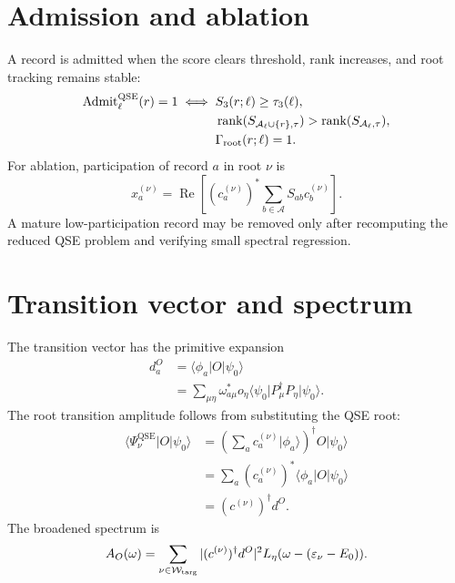 \documentclass[10pt,twocolumn]{article}
\newcommand{\Acal}{\mathcal A}
\newcommand{\Wcal}{\mathcal W}
\newcommand{\qse}{\mathrm{QSE}}
\newcommand{\rank}{\operatorname{rank}}
\newcommand{\ket}[1]{\lvert #1\rangle}
\newcommand{\bra}[1]{\langle #1\rvert}
\begin{document}
\section{Admission and ablation}

A record is admitted when the score clears threshold, rank increases, and root tracking remains stable:
\begin{equation}
\begin{aligned}
\operatorname{Admit}_\ell^{\qse}(r)=1
\iff{}&S_3(r;\ell)\ge\tau_3(\ell),\\
&\rank(S_{\Acal_\ell\cup\{r\},\tau})>\rank(S_{\Acal_\ell,\tau}),\\
&\Gamma_{\rm root}(r;\ell)=1.
\end{aligned}
\label{eq:admit}
\end{equation}
For ablation, participation of record \(a\) in root \(\nu\) is
\begin{equation}
x_a^{(\nu)}=
\operatorname{Re}\left[(c_a^{(\nu)})^*
\sum_{b\in\Acal}S_{ab}c_b^{(\nu)}\right].
\label{eq:participation}
\end{equation}
A mature low-participation record may be removed only after recomputing the reduced QSE problem and verifying small spectral regression.

\section{Transition vector and spectrum}

The transition vector has the primitive expansion
\begin{equation}
\begin{aligned}
d_a^O
&=\bra{\phi_a}O\ket{\psi_0}\\
&=\sum_{\mu\eta}\omega_{a\mu}^*o_\eta
\bra{\psi_0}P_\mu^\dagger P_\eta\ket{\psi_0}.
\end{aligned}
\label{eq:dO}
\end{equation}
The root transition amplitude follows from substituting the QSE root:
\begin{equation}
\begin{aligned}
\bra{\Psi_\nu^{\qse}}O\ket{\psi_0}
&=\left(\sum_a c_a^{(\nu)}\ket{\phi_a}\right)^\dagger O\ket{\psi_0}\\
&=\sum_a(c_a^{(\nu)})^*\bra{\phi_a}O\ket{\psi_0}\\
&=(c^{(\nu)})^\dagger d^O.
\end{aligned}
\label{eq:transition}
\end{equation}
The broadened spectrum is
\begin{equation}
A_O(\omega)=\sum_{\nu\in\Wcal_{\rm targ}}
|(c^{(\nu)})^\dagger d^O|^2
L_\eta(\omega-(\varepsilon_\nu-E_0)).
\label{eq:spectrum}
\end{equation}
\end{document}
